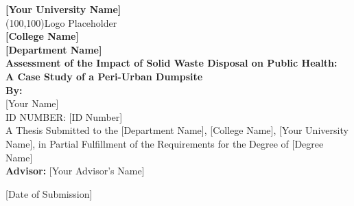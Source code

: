 
\begin{titlepage}
\centering
\vspace*{0.5cm}

{\huge\bfseries [Your University Name]}\\[0.8cm]

\framebox(100,100){Logo Placeholder}\\[1cm]

{\Large\bfseries [College Name]}\\[4pt]
{\Large\bfseries [Department Name]}\\[1.2cm]

{\LARGE\bfseries Assessment of the Impact of Solid Waste Disposal on Public Health:}\\[8pt]
{\LARGE\bfseries A Case Study of a Peri-Urban Dumpsite}\\[1.5cm]

{\large\bfseries By:}\\[4pt]
{\large [Your Name]}\\[4pt]
{\large ID NUMBER: [ID Number]}\\[1.2cm]

A Thesis Submitted to the [Department Name], [College Name], [Your University Name], in Partial Fulfillment of the Requirements for the Degree of [Degree Name]\\[1.2cm]

{\large\bfseries Advisor:} [Your Advisor's Name]\\[1.5cm]

\vfill %

{\large [Date of Submission]}\\[8pt]


\end{titlepage}

